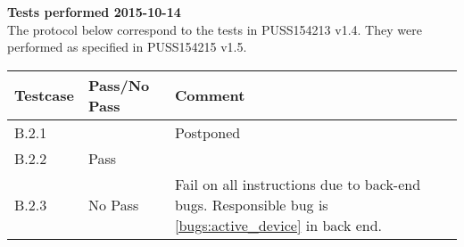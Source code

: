 \renewcommand{\testdate}{2015-10-14}
\textbf{Tests performed \testdate}\\
The protocol below correspond to the tests in PUSS154213 v1.4. They were performed as specified in PUSS154215 v1.5.
\begin{center}
  		\begin{tabular}{| p{3cm} | p{5cm} | p{5cm} |}
    		\hline
	    	\textbf{Testcase}			& \textbf{Pass/No Pass} 	& \textbf{Comment} \\ \hline
    		B.2.1		 						&  										& Postponed  	\\ \hline
    		B.2.2		 						& Pass  									& 				 \\	\hline
    		B.2.3		 						& No Pass 								& Fail on all instructions due to  back-end bugs. Responsible bug is \ref{bugs:active_device} in back end.	 \\	\hline
 		\end{tabular}
\end{center}